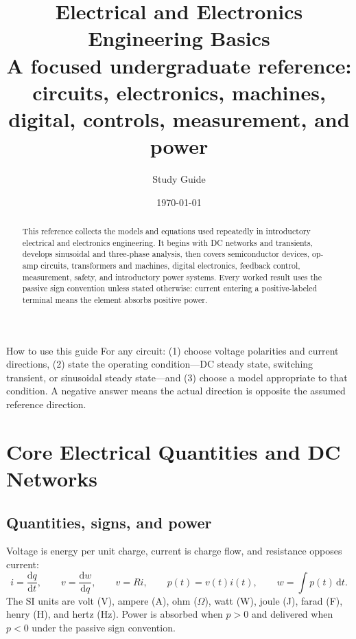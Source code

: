 \documentclass[10pt]{article}
\title{\textbf{Electrical and Electronics Engineering Basics}\\
\large A focused undergraduate reference: circuits, electronics, machines, digital, controls, measurement, and power}
\author{Study Guide}
\date{\today}
\newcommand{\dd}{\mathrm{d}}
\begin{document}
\maketitle

\begin{abstract}
This reference collects the models and equations used repeatedly in introductory
electrical and electronics engineering. It begins with DC networks and
transients, develops sinusoidal and three-phase analysis, then covers semiconductor
devices, op-amp circuits, transformers and machines, digital electronics, feedback
control, measurement, safety, and introductory power systems. Every worked result
uses the passive sign convention unless stated otherwise: current entering a
positive-labeled terminal means the element absorbs positive power.
\end{abstract}

\begin{keybox}{How to use this guide}
For any circuit: (1) choose voltage polarities and current directions, (2) state
the operating condition---DC steady state, switching transient, or sinusoidal
steady state---and (3) choose a model appropriate to that condition. A negative
answer means the actual direction is opposite the assumed reference direction.
\end{keybox}

\tableofcontents
\newpage

\section{Core Electrical Quantities and DC Networks}

\subsection{Quantities, signs, and power}
Voltage is energy per unit charge, current is charge flow, and resistance opposes
current:
\begin{equation}
  i=\frac{\dd q}{\dd t},\qquad v=\frac{\dd w}{\dd q},\qquad v=Ri,
  \qquad p(t)=v(t)i(t),\qquad w=\int p(t)\,\dd t.
\end{equation}
The SI units are volt (V), ampere (A), ohm ($\Omega$), watt (W), joule (J),
farad (F), henry (H), and hertz (Hz). Power is absorbed when $p>0$ and delivered
when $p<0$ under the passive sign convention.
\end{document}
